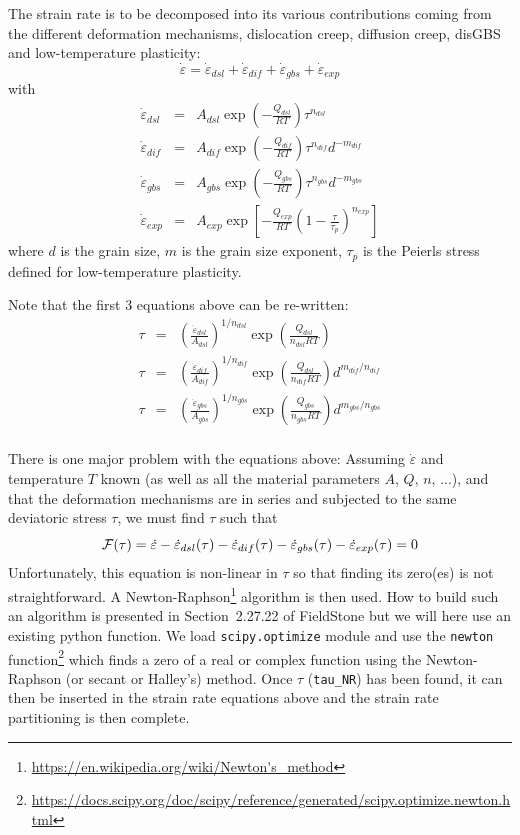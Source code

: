 \documentclass[a4paper]{article}
\begin{document}
The strain rate is to be decomposed into its various contributions 
coming from the different deformation mechanisms, dislocation creep,
diffusion creep, disGBS and low-temperature plasticity:
\[
\dot\varepsilon = \dot\varepsilon_{dsl} + \dot\varepsilon_{dif} + 
\dot\varepsilon_{gbs} + \dot\varepsilon_{exp} 
\]
with
\begin{eqnarray}
\dot{\varepsilon}_{dsl}&=&A_{dsl}\exp\left(-\frac{Q_{dsl}}{RT} \right) \tau^{n_{dsl}}  \\
\dot{\varepsilon}_{dif}&=&A_{dif}\exp\left(-\frac{Q_{dif}}{RT} \right) \tau^{n_{dif}} d^{-m_{dif}} \\
\dot{\varepsilon}_{gbs}&=&A_{gbs}\exp\left(-\frac{Q_{gbs}}{RT} \right) \tau^{n_{gbs}} d^{-m_{gbs}} \\
\dot{\varepsilon}_{exp}&=&A_{exp}\exp\left[-\frac{Q_{exp}}{RT} \left(1 -\frac{\tau}{\tau_p}\right)^{n_{exp}} \right]   
\end{eqnarray}
where $d$ is the grain size, $m$ is the grain size exponent, $\tau_p$ is the Peierls stress defined
for low-temperature plasticity.

Note that the first 3 equations above can be re-written:
\begin{eqnarray}
\tau &=& \left(\frac{\dot{\varepsilon}_{dsl}}{A_{dsl}} \right)^{1/n_{dsl}} \exp\left(\frac{Q_{dsl}}{n_{dsl}RT} \right) \\ 
\tau &=& \left(\frac{\dot{\varepsilon}_{dif}}{A_{dif}} \right)^{1/n_{dif}} \exp\left(\frac{Q_{dsl}}{n_{dif}RT} \right) d^{m_{dif}/n_{dif}} \\
\tau &=& \left(\frac{\dot{\varepsilon}_{gbs}}{A_{gbs}} \right)^{1/n_{gbs}} \exp\left(\frac{Q_{gbs}}{n_{gbs}RT} \right) d^{m_{gbs}/n_{gbs}} \\
\end{eqnarray}



There is one major problem with the equations above:
Assuming $\dot\varepsilon$ and temperature $T$ known (as well as all the material parameters $A$, $Q$, $n$, ...),
and that the deformation mechanisms are in series and subjected to the same deviatoric stress $\tau$,
we must find $\tau$ such that
\[
{\cal F}(\tau) = \dot\varepsilon -  \dot\varepsilon_{dsl}(\tau) 
-\dot\varepsilon_{dif}(\tau) -\dot\varepsilon_{gbs}(\tau) - \dot\varepsilon_{exp}(\tau) =0
\]
Unfortunately, this equation is non-linear in $\tau$ so that finding its zero(es) is not
straightforward. A Newton-Raphson\footnote{\url{https://en.wikipedia.org/wiki/Newton's_method}}
algorithm is then used. How to build such an algorithm is presented in Section~2.27.22 of FieldStone
but we will here use an existing python function.
We load \lstinline{scipy.optimize} module and use the \lstinline{newton} function\footnote{\url{
https://docs.scipy.org/doc/scipy/reference/generated/scipy.optimize.newton.html}}
which finds a zero of a real or complex function using the Newton-Raphson (or secant or Halley’s) method.
Once $\tau$ (\lstinline{tau_NR}) has been found, it can then be inserted in the strain rate equations above and
the strain rate partitioning is then complete.
\end{document}
